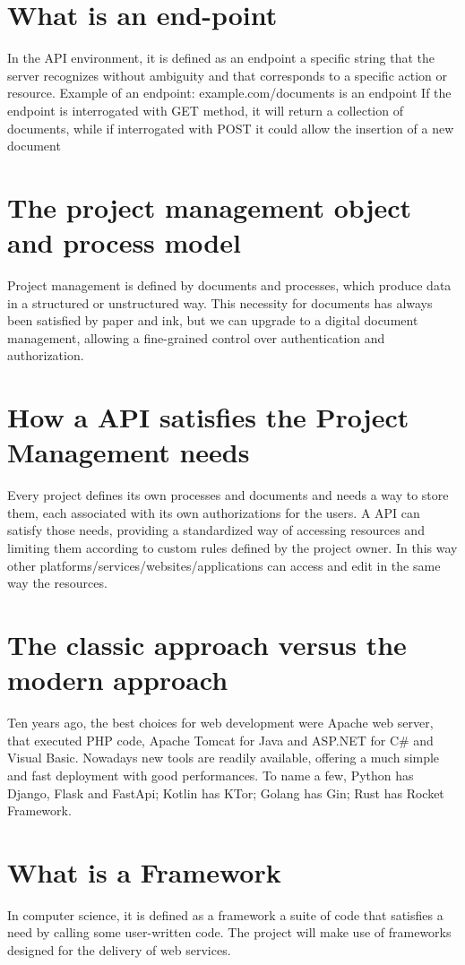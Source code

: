 \documentclass[12pt]{report}
\begin{document}
\section{What is an end-point}
In the API environment, it is defined as an endpoint a specific string that the server recognizes without ambiguity and that corresponds to a specific action or resource.
Example of an endpoint:
example.com/documents is an endpoint 
If the endpoint is interrogated with GET method, it will return a collection of documents, while if interrogated with POST it could allow the insertion of a new document

\section{The project management object and process model}
Project management is defined by documents and processes, which produce data in a structured or unstructured way. This necessity for documents has always been satisfied by paper and ink, but we can upgrade to a digital document management, allowing a fine-grained control over authentication and authorization.

\section{How a API satisfies the Project Management needs}
Every project defines its own processes and documents and needs a way to store them, each associated with its own authorizations for the users.
A API can satisfy those needs, providing a standardized way of accessing resources and limiting them according to custom rules defined by the project owner.
In this way other platforms/services/websites/applications can access and edit in the same way the resources.

\section{The classic approach versus the modern approach}
Ten years ago, the best choices for web development were Apache web server, that executed PHP code, Apache Tomcat for Java and ASP.NET for C\# and Visual Basic.
Nowadays new tools are readily available, offering a much simple and fast deployment with good performances.
To name a few, Python has Django, Flask and FastApi; Kotlin has KTor; Golang has Gin; Rust has Rocket Framework.

\section{What is a Framework}
In computer science, it is defined as a framework a suite of code that satisfies a need by calling some user-written code. The project will make use of frameworks designed for the delivery of web services.
\end{document}
